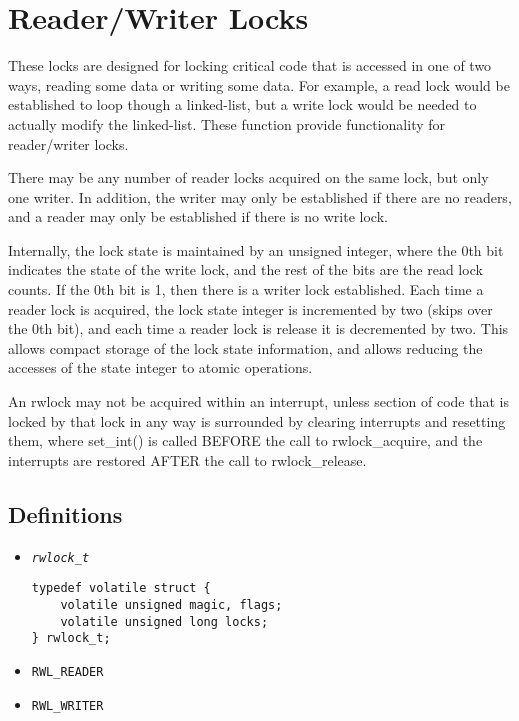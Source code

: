 \section{Reader/Writer Locks}

These locks are designed for locking critical code that is accessed in one of two ways, reading
some data or writing some data. For example, a read lock would be established to loop though a 
linked-list, but a write lock would be needed to actually modify the linked-list. These function provide
functionality for reader/writer locks.

There may be any number of reader locks acquired on the same lock, but only one writer. In addition, 
the writer may only be established if there are no readers, and a reader may only be established if
there is no write lock.

Internally, the lock state is maintained by an unsigned integer, where the 0th bit indicates the 
state of the write lock, and the rest of the bits are the read lock counts. If the 0th bit is 1, then
there is a writer lock established. Each time a reader lock is acquired, the lock state integer is
incremented by two (skips over the 0th bit), and each time a reader lock is release it is decremented
by two. This allows compact storage of the lock state information, and allows reducing the accesses of
the state integer to atomic operations.

An rwlock may not be acquired within an interrupt, unless section of code that is locked by that
lock in any way is surrounded by clearing interrupts and resetting them, where set\_int() is called
BEFORE the call to rwlock\_acquire, and the interrupts are restored AFTER the call to rwlock\_release.

\subsection{Definitions}
\begin{itemize}
\item \texttt{\textit{rwlock\_t}} 
\begin{lstlisting}
typedef volatile struct {
	volatile unsigned magic, flags;
	volatile unsigned long locks;
} rwlock_t;
\end{lstlisting}
\item \texttt{RWL\_READER}
\item \texttt{RWL\_WRITER}
\end{itemize}


